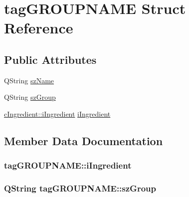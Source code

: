 \hypertarget{structtag_g_r_o_u_p_n_a_m_e}{}\section{tag\+G\+R\+O\+U\+P\+N\+A\+ME Struct Reference}
\label{structtag_g_r_o_u_p_n_a_m_e}
\subsection*{Public Attributes}
\begin{DoxyCompactItemize}
\item 
Q\+String \hyperlink{structtag_g_r_o_u_p_n_a_m_e_a9edbd20fb9240c9cfb7692434113b1ce}{sz\+Name}
\item 
Q\+String \hyperlink{structtag_g_r_o_u_p_n_a_m_e_a01edd24854885980180ce90800478f59}{sz\+Group}
\item 
\hyperlink{classc_ingredient_acf023723841ec66cd6368a25e3174a28}{c\+Ingredient\+::i\+Ingredient} \hyperlink{structtag_g_r_o_u_p_n_a_m_e_a5c93bf2c7557248a7080f54200d81cb4}{i\+Ingredient}
\end{DoxyCompactItemize}


\subsection{Member Data Documentation}
\subsubsection[{\texorpdfstring{i\+Ingredient}{iIngredient}}]{ tag\+G\+R\+O\+U\+P\+N\+A\+M\+E\+::i\+Ingredient}\hypertarget{structtag_g_r_o_u_p_n_a_m_e_a5c93bf2c7557248a7080f54200d81cb4}{}\label{structtag_g_r_o_u_p_n_a_m_e_a5c93bf2c7557248a7080f54200d81cb4}
\subsubsection[{\texorpdfstring{sz\+Group}{szGroup}}]{\setlength{\rightskip}{0pt plus 5cm}Q\+String tag\+G\+R\+O\+U\+P\+N\+A\+M\+E\+::sz\+Group}\hypertarget{structtag_g_r_o_u_p_n_a_m_e_a01edd24854885980180ce90800478f59}{}\label{structtag_g_r_o_u_p_n_a_m_e_a01edd24854885980180ce90800478f59}
